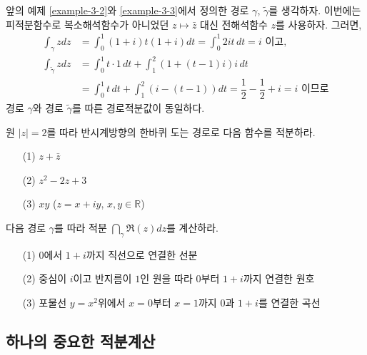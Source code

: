 \begin{saltexample}[label=example-3-4]{}{}
앞의 예제 \ref{example-3-2}와   \ref{example-3-3}에서 정의한
경로 $\gamma$, $\tilde\gamma$를 생각하자.
이번에는 피적분함수로 복소해석함수가 아니었던 $z\mapsto\bar z$ 대신 
전해석함수 $z$를 사용하자. 그러면,
\begin{align*}
\int_\gamma z dz 
&= \int_0^1 (1+i)t(1+i)dt = \int_0^1 2it\,dt = i \text{ 이고,} \\
\int_{\tilde\gamma} z dz
&= \int_0^1 t\cdot1\, dt + \int_1^2 (1+(t-1)i)i\, dt \\
&= \int_0^1 t\, dt + \int_1^2 (i-(t-1))dt
= \dfrac 12 - \dfrac12 + i = i  \text{ 이므로}
\end{align*}
경로 $\gamma$와 경로 $\tilde\gamma$를 따른  경로적분값이 동일하다.
\end{saltexample}

\begin{salt_exercise} \label{ex-3-3}
원 $|z|=2$를 따라 반시계방향의 한바퀴 도는 경로로 다음 함수를 적분하라.
\begin{itemize}
\item[(1)] $z+\bar z$
\item[(2)] $z^2-2z+3$
\item[(3)] $xy$ ($z=x+iy$, $x,y\in\mathbb R$)
\end{itemize}
\end{salt_exercise}


\begin{salt_exercise} \label{ex-3-4}
다음 경로 $\gamma$를 따라 적분 $\dint_\gamma \Re(z)dz$를 계산하라.
\begin{itemize}
\item[(1)] $0$에서 $1+i$까지 직선으로 연결한 선분
\item[(2)] 중심이 $i$이고 반지름이 $1$인 원을 따라 $0$부터 $1+i$까지 연결한 원호
\item[(3)] 포물선 $y=x^2$위에서 $x=0$부터 $x=1$까지 $0$과 $1+i$를 연결한 곡선
\end{itemize}
\end{salt_exercise}

\subsection{하나의 중요한 적분계산}

